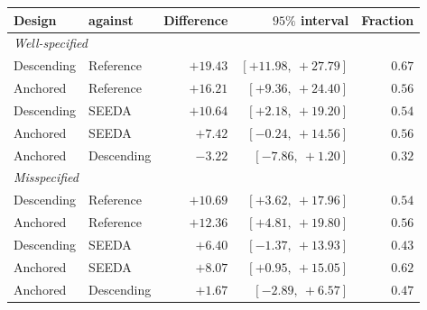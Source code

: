 \begin{tabular}{llrrr}
\toprule
Design & against & Difference & $95\%$ interval & Fraction \\
\midrule
\multicolumn{5}{l}{\emph{Well-specified}} \\
Descending & Reference & $+19.43$ & $\mathbf{[+11.98,\ +27.79]}$ & $0.67$ \\
Anchored & Reference & $+16.21$ & $\mathbf{[+9.36,\ +24.40]}$ & $0.56$ \\
Descending & SEEDA & $+10.64$ & $\mathbf{[+2.18,\ +19.20]}$ & $0.54$ \\
Anchored & SEEDA & $+7.42$ & $[-0.24,\ +14.56]$ & $0.56$ \\
Anchored & Descending & $-3.22$ & $[-7.86,\ +1.20]$ & $0.32$ \\
\midrule
\multicolumn{5}{l}{\emph{Misspecified}} \\
Descending & Reference & $+10.69$ & $\mathbf{[+3.62,\ +17.96]}$ & $0.54$ \\
Anchored & Reference & $+12.36$ & $\mathbf{[+4.81,\ +19.80]}$ & $0.56$ \\
Descending & SEEDA & $+6.40$ & $[-1.37,\ +13.93]$ & $0.43$ \\
Anchored & SEEDA & $+8.07$ & $\mathbf{[+0.95,\ +15.05]}$ & $0.62$ \\
Anchored & Descending & $+1.67$ & $[-2.89,\ +6.57]$ & $0.47$ \\
\bottomrule
\end{tabular}

